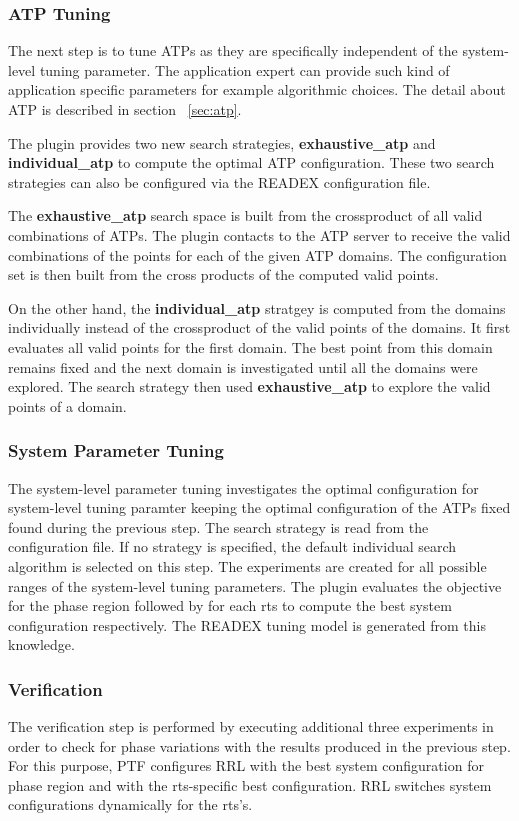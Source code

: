 \subsubsection{ATP Tuning} \label{atp-tuning} 
The next step is to tune ATPs as they are specifically independent of the system-level tuning parameter. The application expert can provide such kind of application specific parameters for example algorithmic choices. The detail about ATP is described in section ~\ref{sec:atp}. 

The plugin provides two new search strategies, \textbf{exhaustive\_atp} and \textbf{individual\_atp} to compute the optimal ATP configuration. These two search strategies can also be configured via the READEX configuration file.

The \textbf{exhaustive\_atp} search space is built from the crossproduct of all valid combinations of ATPs. The plugin contacts to the ATP server to receive the valid combinations of the points for each of the given ATP domains. The configuration set   is then built from the cross products of the computed valid points. 

On the other hand, the \textbf{individual\_atp} stratgey is computed from the domains individually instead of the crossproduct of the valid points of the domains. It first evaluates all valid points for the first domain. The best point from this domain remains fixed and the next domain is investigated until all the domains were explored. The search strategy then used \textbf{exhaustive\_atp} to explore the valid points of a domain. 

\subsubsection{System Parameter Tuning} \label{sys-tuning} 
The system-level parameter tuning investigates the optimal configuration for system-level tuning paramter keeping the optimal configuration of the ATPs fixed found during the previous step. The search strategy is read from the configuration file. If no strategy is specified, the default individual search algorithm is selected on this step. The experiments are created for all possible ranges of the system-level tuning parameters. The plugin evaluates the objective for the phase region followed by for each rts to compute the best system configuration respectively. The READEX tuning model is generated from this knowledge. 

\subsubsection{Verification} \label{intra-verification} 
The verification step is performed by executing additional three experiments in order to check for phase variations with the results produced in the previous step. For this purpose, PTF configures RRL with the best system configuration for phase region and with the rts-specific best configuration. RRL switches system configurations dynamically for the rts's. 

